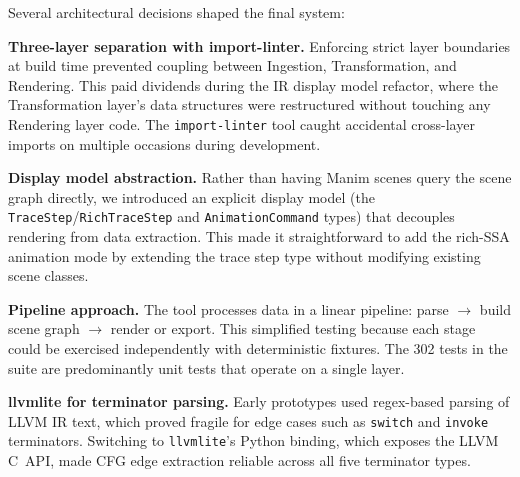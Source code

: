 Several architectural decisions shaped the final system:

\textbf{Three-layer separation with import-linter.} Enforcing strict layer boundaries at build time prevented coupling between Ingestion, Transformation, and Rendering. This paid dividends during the IR display model refactor, where the Transformation layer's data structures were restructured without touching any Rendering layer code. The \texttt{import-linter} tool caught accidental cross-layer imports on multiple occasions during development.

\textbf{Display model abstraction.} Rather than having Manim scenes query the scene graph directly, we introduced an explicit display model (the \texttt{TraceStep}/\texttt{RichTraceStep} and \texttt{AnimationCommand} types) that decouples rendering from data extraction. This made it straightforward to add the rich-SSA animation mode by extending the trace step type without modifying existing scene classes.

\textbf{Pipeline approach.} The tool processes data in a linear pipeline: parse $\rightarrow$ build scene graph $\rightarrow$ render or export. This simplified testing because each stage could be exercised independently with deterministic fixtures. The 302 tests in the suite are predominantly unit tests that operate on a single layer.

\textbf{llvmlite for terminator parsing.} Early prototypes used regex-based parsing of LLVM IR text, which proved fragile for edge cases such as \texttt{switch} and \texttt{invoke} terminators. Switching to \texttt{llvmlite}'s Python binding, which exposes the LLVM C~API, made CFG edge extraction reliable across all five terminator types.
